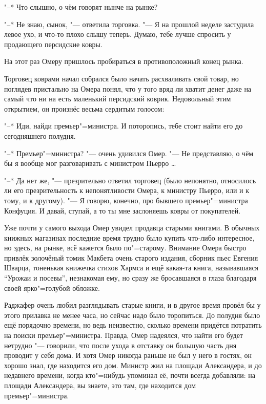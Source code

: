 "--* Что слышно, о чём говорят нынче на рынке?

"--* Не знаю, сынок, "--- ответила торговка.
"--- Я на прошлой неделе застудила левое ухо, и что-то плохо слышу теперь.
Думаю, тебе лучше спросить у продающего персидские ковры.

На этот раз Омеру пришлось пробираться в противоположный конец рынка.

Торговец коврами начал собрался было начать расхваливать свой товар, но поглядев
пристально на Омера понял, что у того вряд ли хватит денег даже на самый что ни
на есть маленький персидский коврик.
Недовольный этим открытием, он произнёс весьма сердитым голосом:

"--* Иди, найди премьер"=министра.
И поторопись, тебе стоит найти его до сегодняшнего полудня.

"--* Премьер"=министра? "--- очень удивился Омер.
"--- Не представляю, о чём бы я вообще мог разговаривать с министром
Пьерро \ldots

"--* Да нет же, "--- презрительно ответил торговец (было непонятно, относилось
ли его презрительность к непонятливости Омера, к министру Пьерро, или и к тому,
и к другому).
"--- Я говорю, конечно, про бывшего премьер"=министра Конфуция.
И давай, ступай, а то ты мне заслоняешь ковры от покупателей.

Уже почти у самого выхода Омер увидел продавца старыми книгами.
В обычных книжных магазинах последние время трудно было купить что-либо
интересное, но здесь, на рынке, всё кажется было по"=старому.
Внимание Омера быстро привлёк золочёный томик Макбета очень старого издания,
сборник пьес Евгения Шварца, тоненькая книжечка стихов Хармса и ещё какая-та
книга, называвшаяся \enquote{Урожаи и посевы}, незнакомая ему, но сразу же
бросавшаяся в глаза благодаря своей ярко"=голубой обложке.

Раджафер очень любил разглядывать старые книги, и в другое время провёл бы у
этого прилавка не менее часа, но сейчас надо было торопиться.
До полудня было ещё порядочно времени, но ведь неизвестно, сколько времени
придётся потратить на поиски премьер"=министра.
Правда, Омер надеялся, что найти его будет нетрудно "--- говорили, что после
ухода в отставку он большую часть дня проводит у себя дома.
И хотя Омер никогда раньше не был у него в гостях, он хорошо знал, где находится
его дом.
Министр жил на площади Александера, и до недавнего времени, когда кто"=нибудь
упоминал её, почти всегда добавляли: на площади Александера, вы знаете, это там,
где находится дом премьер"=министра.

